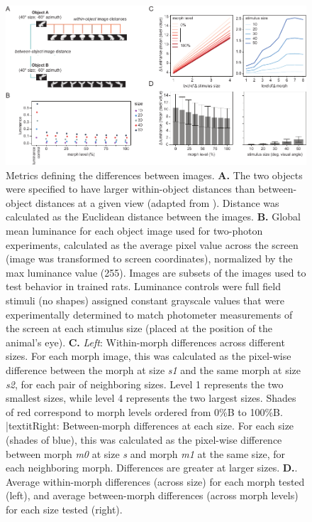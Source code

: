 \begin{figure}[t!]
\includegraphics[width=\textwidth]{figures/supplemental/fig_s4_stimulus_metrics/fig_s4_stimulus_metrics.pdf}
    \vspace{.1in}
    \caption[Stimulus metrics]{Metrics defining the differences between images.
    \textbf{A.} The two objects were specified to have larger within-object distances than between-object distances at a given view (adapted from \cite{Zoccolan2009}). Distance was calculated as the Euclidean distance between the images. 
    \textbf{B.} Global mean luminance for each object image used for two-photon experiments, calculated as the average pixel value across the screen (image was transformed to screen coordinates), normalized by the max luminance value (255). Images are subsets of the images used to test behavior in trained rats. Luminance controls were full field stimuli (no shapes) assigned constant grayscale values that were experimentally determined to match photometer measurements of the screen at each stimulus size (placed at the position of the animal's eye). 
    \textbf{C.} \textit{Left}: Within-morph differences across different sizes. For each morph image, this was calculated as the pixel-wise difference between the morph at size \textit{s1} and the same morph at size \textit{s2}, for each pair of neighboring sizes. Level 1 represents the two smallest sizes, while level 4 represents the two largest sizes. Shades of red correspond to morph levels ordered from 0\%B to 100\%B. |textit{Right}:  Between-morph differences at each size. For each size (shades of blue), this was calculated as the pixel-wise difference between morph \textit{m0} at size \textit{s} and morph \textit{m1} at the same size, for each neighboring morph. Differences are greater at larger sizes.
    \textbf{D.}. Average within-morph differences (across size) for each morph tested (left), and average between-morph differences (across morph levels) for each size tested (right).    
    \label{supfig:stimulus_metrics}}
\end{figure}

